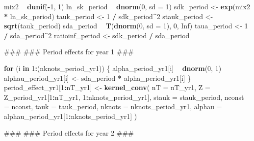\documentclass[11pt,]{article}
\newenvironment{Shaded}{\begin{snugshade}}{\end{snugshade}}
\newcommand{\KeywordTok}[1]{\textcolor[rgb]{0.13,0.29,0.53}{\textbf{#1}}}
\newcommand{\DataTypeTok}[1]{\textcolor[rgb]{0.13,0.29,0.53}{#1}}
\newcommand{\DecValTok}[1]{\textcolor[rgb]{0.00,0.00,0.81}{#1}}
\newcommand{\StringTok}[1]{\textcolor[rgb]{0.31,0.60,0.02}{#1}}
\newcommand{\OtherTok}[1]{\textcolor[rgb]{0.56,0.35,0.01}{#1}}
\newcommand{\ControlFlowTok}[1]{\textcolor[rgb]{0.13,0.29,0.53}{\textbf{#1}}}
\newcommand{\OperatorTok}[1]{\textcolor[rgb]{0.81,0.36,0.00}{\textbf{#1}}}
\newcommand{\NormalTok}[1]{#1}
\begin{document}
\begin{Shaded}
\begin{Highlighting}[]
\NormalTok{  mix2 }\OperatorTok{~}\StringTok{ }\KeywordTok{dunif}\NormalTok{(}\OperatorTok{-}\DecValTok{1}\NormalTok{, }\DecValTok{1}\NormalTok{)}
\NormalTok{  ln_sk_period }\OperatorTok{~}\StringTok{ }\KeywordTok{dnorm}\NormalTok{(}\DecValTok{0}\NormalTok{, }\DataTypeTok{sd =} \DecValTok{1}\NormalTok{)}
\NormalTok{  sdk_period <-}\StringTok{ }\KeywordTok{exp}\NormalTok{(mix2 }\OperatorTok{*}\StringTok{ }\NormalTok{ln_sk_period)}
\NormalTok{  tauk_period <-}\StringTok{ }\DecValTok{1} \OperatorTok{/}\StringTok{ }\NormalTok{sdk_period}\OperatorTok{^}\DecValTok{2}
\NormalTok{  stauk_period <-}\StringTok{ }\KeywordTok{sqrt}\NormalTok{(tauk_period)}
\NormalTok{  sda_period }\OperatorTok{~}\StringTok{ }\KeywordTok{T}\NormalTok{(}\KeywordTok{dnorm}\NormalTok{(}\DecValTok{0}\NormalTok{, }\DataTypeTok{sd =} \DecValTok{1}\NormalTok{), }\DecValTok{0}\NormalTok{, }\OtherTok{Inf}\NormalTok{)}
\NormalTok{  taua_period <-}\StringTok{ }\DecValTok{1} \OperatorTok{/}\StringTok{ }\NormalTok{sda_period}\OperatorTok{^}\DecValTok{2}
\NormalTok{  ratioinf_period <-}\StringTok{ }\NormalTok{sdk_period }\OperatorTok{/}\StringTok{ }\NormalTok{sda_period}

\NormalTok{  ###}
\NormalTok{  ### Period effects for year 1}
\NormalTok{  ###}

  \ControlFlowTok{for}\NormalTok{ (i }\ControlFlowTok{in} \DecValTok{1}\OperatorTok{:}\NormalTok{(nknots_period_yr1)) \{}
\NormalTok{    alpha_period_yr1[i] }\OperatorTok{~}\StringTok{ }\KeywordTok{dnorm}\NormalTok{(}\DecValTok{0}\NormalTok{, }\DecValTok{1}\NormalTok{)}
\NormalTok{    alphau_period_yr1[i] <-}\StringTok{ }\NormalTok{sda_period }\OperatorTok{*}\StringTok{ }\NormalTok{alpha_period_yr1[i]}
\NormalTok{  \}}
\NormalTok{  period_effect_yr1[}\DecValTok{1}\OperatorTok{:}\NormalTok{nT_yr1] <-}\StringTok{ }\KeywordTok{kernel_conv}\NormalTok{(}
    \DataTypeTok{nT =}\NormalTok{ nT_yr1,}
    \DataTypeTok{Z =}\NormalTok{ Z_period_yr1[}\DecValTok{1}\OperatorTok{:}\NormalTok{nT_yr1, }\DecValTok{1}\OperatorTok{:}\NormalTok{nknots_period_yr1],}
    \DataTypeTok{stauk =}\NormalTok{ stauk_period,}
    \DataTypeTok{nconst =}\NormalTok{ nconst,}
    \DataTypeTok{tauk =}\NormalTok{ tauk_period,}
    \DataTypeTok{nknots =}\NormalTok{ nknots_period_yr1,}
    \DataTypeTok{alphau =}\NormalTok{ alphau_period_yr1[}\DecValTok{1}\OperatorTok{:}\NormalTok{nknots_period_yr1]}
\NormalTok{  )}

\NormalTok{  ###}
\NormalTok{  ### Period effects for year 2}
\NormalTok{  ###}


\end{Highlighting}
\end{Shaded}
\end{document}
